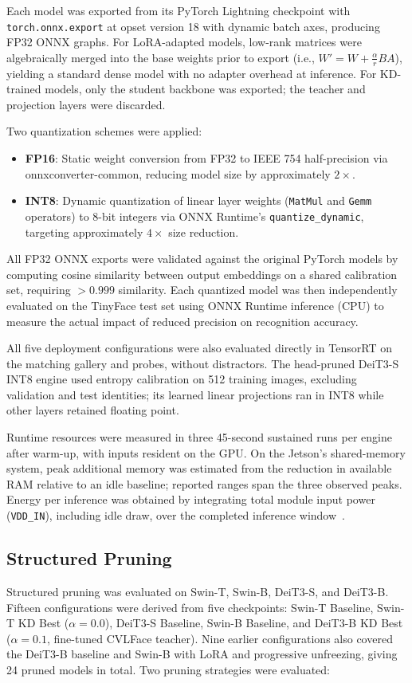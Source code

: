 \documentclass[runningheads,a4paper]{llncs}
\begin{document}
Each model was exported from its PyTorch Lightning checkpoint with \texttt{torch.onnx.export} at opset version 18 with dynamic batch axes, producing FP32 ONNX graphs. For LoRA-adapted models, low-rank matrices were algebraically merged into the base weights prior to export (i.e., $W' = W + \frac{\alpha}{r} BA$), yielding a standard dense model with no adapter overhead at inference. For KD-trained models, only the student backbone was exported; the teacher and projection layers were discarded.

Two quantization schemes were applied:
\begin{itemize}
    \item \textbf{FP16}: Static weight conversion from FP32 to IEEE 754 half-precision via onnxconverter-common, reducing model size by approximately $2\times$.
    \item \textbf{INT8}: Dynamic quantization of linear layer weights (\texttt{MatMul} and \texttt{Gemm} operators) to 8-bit integers via ONNX Runtime's \texttt{quantize\_dynamic}, targeting approximately $4\times$ size reduction.
\end{itemize}
All FP32 ONNX exports were validated against the original PyTorch models by computing cosine similarity between output embeddings on a shared calibration set, requiring $>0.999$ similarity. Each quantized model was then independently evaluated on the TinyFace test set using ONNX Runtime inference (CPU) to measure the actual impact of reduced precision on recognition accuracy.

All five deployment configurations were also evaluated directly in TensorRT on the matching gallery and probes, without distractors. The head-pruned DeiT3-S INT8 engine used entropy calibration on 512 training images, excluding validation and test identities; its learned linear projections ran in INT8 while other layers retained floating point.

Runtime resources were measured in three 45-second sustained runs per engine after warm-up, with inputs resident on the GPU. On the Jetson's shared-memory system, peak additional memory was estimated from the reduction in available RAM relative to an idle baseline; reported ranges span the three observed peaks. Energy per inference was obtained by integrating total module input power (\texttt{VDD\_IN}), including idle draw, over the completed inference window~\cite{NVIDIAJetsonPower}.

\subsection{Structured Pruning}\label{sec:pruning-setup}
Structured pruning was evaluated on Swin-T, Swin-B, DeiT3-S, and DeiT3-B. Fifteen configurations were derived from five checkpoints: Swin-T Baseline, Swin-T KD Best ($\alpha{=}0.0$), DeiT3-S Baseline, Swin-B Baseline, and DeiT3-B KD Best ($\alpha{=}0.1$, fine-tuned CVLFace teacher). Nine earlier configurations also covered the DeiT3-B baseline and Swin-B with LoRA and progressive unfreezing, giving 24 pruned models in total. Two pruning strategies were evaluated:
\end{document}
